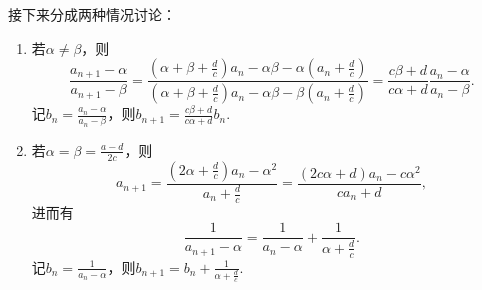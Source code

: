 接下来分成两种情况讨论：\begin{enumerate}
\item 若\(\alpha\neq\beta\)，则\[
\frac{a_{n+1}-\alpha}{a_{n+1}-\beta}
= \frac{\left(\alpha+\beta+\frac{d}{c}\right) a_n - \alpha\beta - \alpha \left(a_n + \frac{d}{c}\right)}{\left(\alpha+\beta+\frac{d}{c}\right) a_n - \alpha\beta - \beta \left(a_n + \frac{d}{c}\right)}
= \frac{c\beta+d}{c\alpha+d} \frac{a_n-\alpha}{a_n-\beta}.
\]记\(b_n = \frac{a_n-\alpha}{a_n-\beta}\)，则\(b_{n+1} = \frac{c\beta+d}{c\alpha+d} b_n\).

\item 若\(\alpha=\beta=\frac{a-d}{2c}\)，则\[
a_{n+1} = \frac{\left(2\alpha+\frac{d}{c}\right) a_n - \alpha^2}{a_n + \frac{d}{c}}
= \frac{(2c\alpha+d)a_n-c\alpha^2}{c a_n+d},
\]进而有\[
\frac{1}{a_{n+1}-\alpha}=\frac{1}{a_n-\alpha}+\frac{1}{\alpha+\frac{d}{c}}.
\]记\(b_n = \frac{1}{a_n-\alpha}\)，则\(b_{n+1} = b_n + \frac{1}{\alpha+\frac{d}{c}}\).
\end{enumerate}
